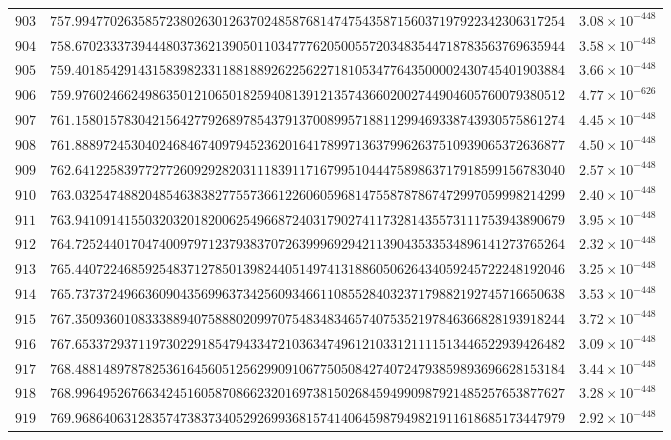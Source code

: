 \documentclass[12pt,reqno]{amsart}
\theoremstyle{remark}
\begin{document}
\begin{longtable}{clc}
$903$ & $757.9947702635857238026301263702485876814747543587156037197922342306317254$ & $3.08\times 10^{-448}$ \\
$904$ & $758.6702333739444803736213905011034777620500557203483544718783563769635944$ & $3.58\times 10^{-448}$ \\
$905$ & $759.4018542914315839823311881889262256227181053477643500002430745401903884$ & $3.66\times 10^{-448}$ \\
$906$ & $759.9760246624986350121065018259408139121357436602002744904605760079380512$ & $4.77\times 10^{-626}$ \\
$907$ & $761.1580157830421564277926897854379137008995718811299469338743930575861274$ & $4.45\times 10^{-448}$ \\
$908$ & $761.8889724530402468467409794523620164178997136379962637510939065372636877$ & $4.50\times 10^{-448}$ \\
$909$ & $762.6412258397727726092928203111839117167995104447589863717918599156783040$ & $2.57\times 10^{-448}$ \\
$910$ & $763.0325474882048546383827755736612260605968147558787867472997059998214299$ & $2.40\times 10^{-448}$ \\
$911$ & $763.9410914155032032018200625496687240317902741173281435573111753943890679$ & $3.95\times 10^{-448}$ \\
$912$ & $764.7252440170474009797123793837072639996929421139043533534896141273765264$ & $2.32\times 10^{-448}$ \\
$913$ & $765.4407224685925483712785013982440514974131886050626434059245722248192046$ & $3.25\times 10^{-448}$ \\
$914$ & $765.7373724966360904356996373425609346611085528403237179882192745716650638$ & $3.53\times 10^{-448}$ \\
$915$ & $767.3509360108333889407588802099707548348346574075352197846366828193918244$ & $3.72\times 10^{-448}$ \\
$916$ & $767.6533729371197302291854794334721036347496121033121111513446522939426482$ & $3.09\times 10^{-448}$ \\
$917$ & $768.4881489787825361645605125629909106775050842740724793859893696628153184$ & $3.44\times 10^{-448}$ \\
$918$ & $768.9964952676634245160587086623201697381502684594990987921485257653877627$ & $3.28\times 10^{-448}$ \\
$919$ & $769.9686406312835747383734052926993681574140645987949821911618685173447979$ & $2.92\times 10^{-448}$ \\

\end{longtable}
\end{document}
